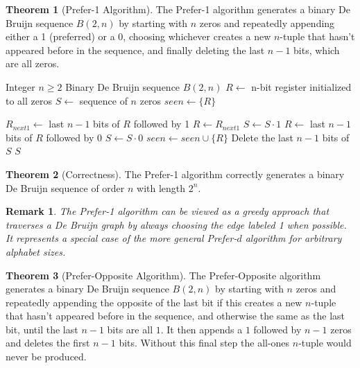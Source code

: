 \documentclass{article}
\newtheorem{remark}{Remark}
\theoremstyle{definition}
\newtheorem{theorem}{Theorem}
\begin{document}
\begin{theorem}[Prefer-1 Algorithm]
The Prefer-1 algorithm generates a binary De Bruijn sequence $B(2, n)$ by starting with $n$ zeros and repeatedly appending either a 1 (preferred) or a 0, choosing whichever creates a new $n$-tuple that hasn't appeared before in the sequence, and finally deleting the last $n-1$ bits, which are all zeros.
\end{theorem}

\begin{algorithm}
\caption{Prefer-1 Algorithm for $B(2, n)$}
\begin{algorithmic}[1]
\Require Integer $n \geq 2$
\Ensure Binary De Bruijn sequence $B(2, n)$
\State $R \gets $ n-bit register initialized to all zeros
\State $S \gets $ sequence of $n$ zeros 
\State $seen \gets \{R\}$ 

    \State $R_{next1} \gets $ last $n-1$ bits of $R$ followed by 1
        \State $R \gets R_{next1}$ 
        \State $S \gets S \cdot 1$ 
    \Else
        \State $R \gets $ last $n-1$ bits of $R$ followed by 0 
        \State $S \gets S \cdot 0$ 
    \EndIf
    \State $seen \gets seen \cup \{R\}$
\EndWhile
\State Delete the last $n-1$ bits of $S$ 
\State \Return $S$
\end{algorithmic}
\end{algorithm}

\begin{theorem}[Correctness]
The Prefer-1 algorithm correctly generates a binary De Bruijn sequence of order $n$ with length $2^n$.
\end{theorem}

\begin{remark}
The Prefer-1 algorithm can be viewed as a greedy approach that traverses a De Bruijn graph by always choosing the edge labeled 1 when possible. It represents a special case of the more general Prefer-$d$ algorithm for arbitrary alphabet sizes.
\end{remark}

\begin{theorem}[Prefer-Opposite Algorithm]
The Prefer-Opposite algorithm generates a binary De Bruijn sequence $B(2, n)$ by starting with $n$ zeros and repeatedly appending the opposite of the last bit if this creates a new $n$-tuple that hasn't appeared before in the sequence, and otherwise the same as the last bit, until the last $n-1$ bits are all $1$. It then appends a $1$ followed by $n-1$ zeros and deletes the first $n-1$ bits. Without this final step the all-ones $n$-tuple would never be produced.
\end{theorem}
\end{document}
